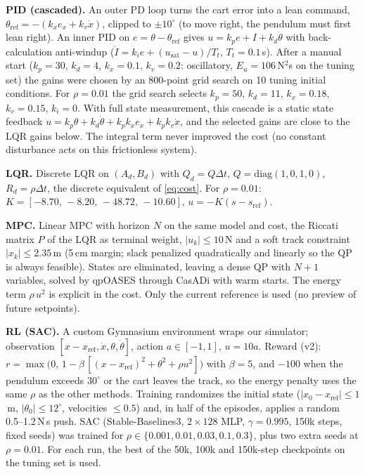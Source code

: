 \documentclass[10pt,twocolumn,a4paper]{article}
\begin{document}
\textbf{PID (cascaded).} An outer PD loop turns the cart error into a lean
command, $\theta_\mathrm{ref}=-(k_x e_x+k_v\dot x)$, clipped to $\pm10^\circ$
(to move right, the pendulum must first lean right). An inner PID on
$e=\theta-\theta_\mathrm{ref}$ gives $u=k_pe+I+k_d\dot\theta$ with
back-calculation anti-windup ($\dot I = k_ie + (u_\mathrm{sat}-u)/T_t$,
$T_t=0.1$\,s). After a manual start ($k_p=30$, $k_d=4$, $k_x=0.1$, $k_v=0.2$:
oscillatory, $E_u=106$\,N$^2$s on the tuning set) the gains were chosen by an
800-point grid search on 10 tuning initial conditions. For $\rho=0.01$ the
grid search selects $k_p=50$, $k_d=11$, $k_x=0.18$, $k_v=0.15$, $k_i=0$.
With full state measurement, this cascade is a static state feedback
$u = k_p\theta + k_d\dot\theta + k_pk_x e_x + k_pk_v\dot x$, and the selected
gains are close to the LQR gains below. The integral term never improved the
cost (no constant disturbance acts on this frictionless system).

\textbf{LQR.} Discrete LQR on $(A_d,B_d)$ with $Q_d=Q\Delta t$,
$Q=\mathrm{diag}(1,0,1,0)$, $R_d=\rho\Delta t$, the discrete equivalent of
\eqref{eq:cost}. For $\rho=0.01$:
$K=[-8.70,\,-8.20,\,-48.72,\,-10.60]$, $u=-K(s-s_\mathrm{ref})$.

\textbf{MPC.} Linear MPC with horizon $N$ on the same model and cost, the
Riccati matrix $P$ of the LQR as terminal weight, $|u_k|\le10$\,N and a soft
track constraint $|x_k|\le 2.35$\,m (5\,cm margin; slack penalized
quadratically and linearly so the QP is always feasible). States are
eliminated, leaving a dense QP with $N+1$ variables, solved by qpOASES through
CasADi with warm starts. The energy term $\rho\,u^2$ is explicit in the cost.
Only the current reference is used (no preview of future setpoints).

\textbf{RL (SAC).} A custom Gymnasium environment wraps our simulator;
observation $[x-x_\mathrm{ref},\dot x,\theta,\dot\theta]$, action
$a\in[-1,1]$, $u=10a$. Reward (v2):
$r=\max\!\bigl(0,\,1-\beta\,[(x-x_\mathrm{ref})^2+\theta^2+\rho u^2]\bigr)$ with
$\beta=5$, and $-100$ when the pendulum exceeds $30^\circ$ or the cart leaves
the track, so the energy penalty uses the same $\rho$ as the other methods.
Training randomizes the initial state ($|x_0-x_\mathrm{ref}|\le1$\,m,
$|\theta_0|\le12^\circ$, velocities $\le0.5$) and, in half of the episodes,
applies a random 0.5--1.2\,N\,s push. SAC (Stable-Baselines3, $2\times128$
MLP, $\gamma=0.995$, 150k steps, fixed seeds) was trained for
$\rho\in\{0.001,0.01,0.03,0.1,0.3\}$, plus two extra seeds at $\rho=0.01$.
For each run, the best of the 50k, 100k and 150k-step checkpoints on the
tuning set is used.
\end{document}
